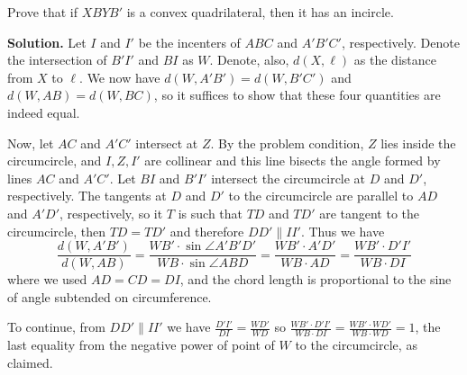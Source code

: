 \documentclass[11pt,a4paper]{article}
\begin{document}
\begin{enumerate}
    	Prove that if $XBYB'$ is a convex quadrilateral, then it has an incircle.
    	
    	\textbf{Solution.} 
    	Let $I$ and $I'$ be the incenters of $ABC$ and $A'B'C'$, respectively. 
    	Denote the intersection of $B'I'$ and $BI$ as $W$. 
    	Denote, also, $d(X, \ell)$ as the distance from $X$ to $\ell$. 
    	We now have $d(W, A'B')=d(W, B'C')$ and $d(W, AB)=d(W, BC)$, 
    	so it suffices to show that these four quantities are indeed equal. 
    	
    	Now, let $AC$ and $A'C'$ intersect at $Z$. 
    	By the problem condition, $Z$ lies inside the circumcircle, and $I, Z, I'$ are collinear and this line bisects the angle formed by lines $AC$ and $A'C'$. 
    	Let $BI$ and $B'I'$ intersect the circumcircle at $D$ and $D'$, respectively. 
    	The tangents at $D$ and $D'$ to the circumcircle are parallel to $AD$ and $A'D'$, respectively, 
    	so it $T$ is such that $TD$ and $TD'$ are tangent to the circumcircle, 
    	then $TD=TD'$ and therefore $DD'\parallel II'$. 
    	Thus we have 
    	\[
    	\frac{d(W, A'B')}{d(W, AB)}
    	=\frac{WB'\cdot\sin\angle A'B'D'}{WB\cdot\sin\angle ABD}
    	=\frac{WB'\cdot A'D'}{WB\cdot AD}
    	=\frac{WB'\cdot D'I'}{WB\cdot DI}
    	\]
    	where we used $AD=CD=DI$, and the chord length is proportional to the sine of angle subtended on circumference. 
    	
    	To continue, from $DD'\parallel II'$ we have $\frac{D'I'}{DI} = \frac{WD'}{WD}$ so 
    	$\frac{WB'\cdot D'I'}{WB\cdot DI}=\frac{WB'\cdot WD'}{WB\cdot WD}=1$, 
    	the last equality from the negative power of point of $W$ to the circumcircle, as claimed. 
    	
    \end{enumerate}
    
\end{document}
